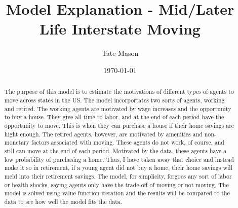 \documentclass[12pt]{article}
\title{Model Explanation - Mid/Later Life Interstate Moving}
\author{Tate Mason}
\date{\today}
\theoremstyle{remark}
\newcommand{\1}{\mathbf{1}}
\begin{document}
\maketitle

\begin{abstract}
  The purpose of this model is to estimate the motivations of different types of agents to move across states in the US. The model incorportates two sorts of agents,
  working and retired. The working agents are motivated by wage increases and the opportunity to buy a house. They give all time to labor, and at the end of each period have
  the opportunity to move. This is when they can purchase a house if their home savings are hight enough. The retired agents, however, are motivated by amenities 
  and non-monetary factors associated with moving. These agents do not work, of course, and still can move at the end of each period. Motivated by the data, these agents
  have a low probability of purchasing a home. Thus, I have taken away that choice and instead make it so in retirement, if a young agent did not buy a home, their home
  savings will meld into their retirement savings. The model, for simplicity, forgoes any sort of labor or health shocks, saying agents only have the trade-off of moving or not moving.
  The model is solved using value function iteration and the results will be compared to the data to see how well the model fits the data.
\end{abstract}
\end{document}
